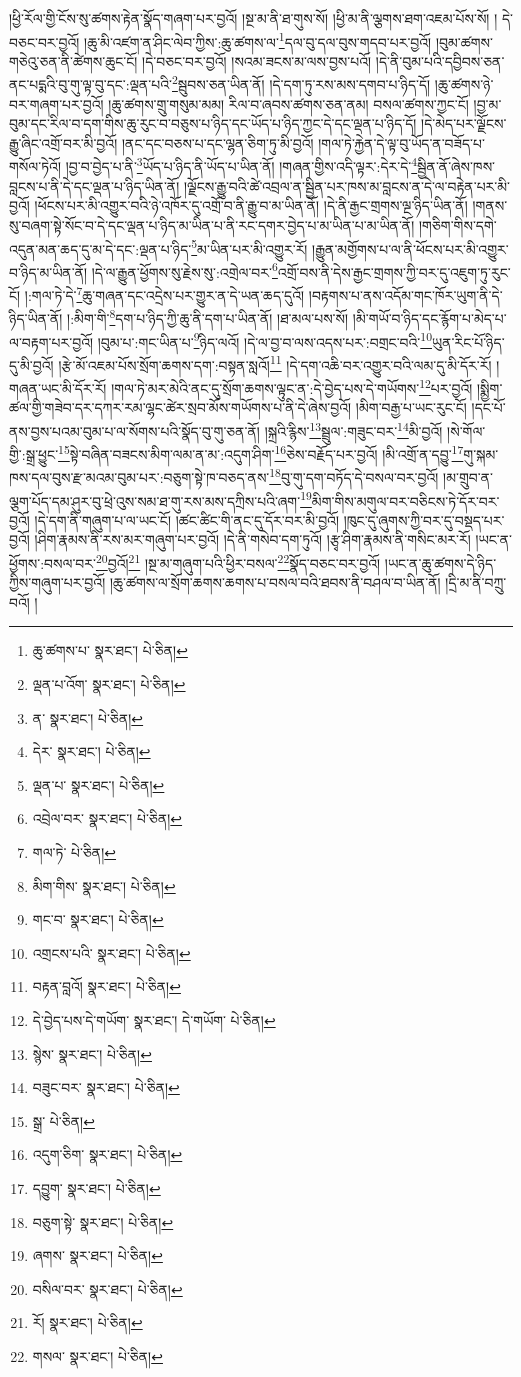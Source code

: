 །ཕྱི་རོལ་གྱི་ངོས་སུ་ཚགས་རྟེན་སྣོད་གཞག་པར་བྱའོ། །སྔ་མ་ནི་ཐ་གུས་སོ། །ཕྱི་མ་ནི་ལྕགས་ཐག་འཇམ་པོས་སོ། །
དེ་བཅང་བར་བྱའོ། །ཆུ་མི་འཛག་ན་ཤིང་ལེབ་ཀྱིས་:ཆུ་ཚགས་ལ་\footnote{ཆུ་ཚགས་པ་  སྣར་ཐང་།  པེ་ཅིན། }དལ་བུ་དལ་བུས་གདབ་པར་བྱའོ། །བུམ་ཚགས་གཅེའུ་ཅན་ནི་ཚེགས་ཆུང་ངོ། །དེ་བཅང་བར་བྱའོ། །སའམ་ཟངས་མ་ལས་བྱས་པའོ། །དེ་ནི་བུམ་པའི་དབྱིབས་ཅན་ནང་པདྨའི་བུ་གུ་ལྟ་བུ་དང་:ལྡན་པའི་\footnote{ལྡན་པ་འོག་  སྣར་ཐང་།  པེ་ཅིན། }སྦུབས་ཅན་ཡིན་ནོ། །དེ་དག་ཏུ་རས་མས་དགབ་པ་ཉིད་དོ། །ཆུ་ཚགས་ཉེ་བར་གཞག་པར་བྱའོ། །ཆུ་ཚགས་གྲུ་གསུམ་མམ། རིལ་བ་ཞབས་ཚགས་ཅན་ནམ། བསལ་ཚགས་ཀྱང་ངོ། །བྱ་མ་བུམ་དང་རིལ་བ་དག་གིས་ཆུ་རུང་བ་བཅུས་པ་ཉིད་དང་ཡོད་པ་ཉིད་ཀྱང་དེ་དང་ལྡན་པ་ཉིད་དོ། །དེ་མེད་པར་ལྗོངས་རྒྱུ་ཞིང་འགྲོ་བར་མི་བྱའོ། །ནང་དང་བཅས་པ་དང་ལྷན་ཅིག་ཏུ་མི་བྱའོ། །གལ་ཏེ་རྐྱེན་དེ་ལྟ་བུ་ཡོད་ན་བཟོད་པ་གསོལ་ཏེའོ། །བྱ་བ་བྱེད་པ་ནི་\footnote{ན་  སྣར་ཐང་།  པེ་ཅིན། }ཡོད་པ་ཉིད་ནི་ཡོད་པ་ཡིན་ནོ། །གཞན་གྱིས་འདི་ལྟར་:དེར་དེ་\footnote{དེར་  སྣར་ཐང་།  པེ་ཅིན། }སྦྱིན་ནོ་ཞེས་ཁས་བླངས་པ་ནི་དེ་དང་ལྡན་པ་ཉིད་ཡིན་ནོ། །ལྗོངས་རྒྱུ་བའི་ཚེ་འབྲལ་ན་སྦྱིན་པར་ཁས་མ་བླངས་ན་དེ་ལ་བརྟེན་པར་མི་བྱའོ། །ཕོངས་པར་མི་འགྱུར་བའི་ཉེ་འཁོར་དུ་འགྲོ་བ་ནི་རྒྱུ་བ་མ་ཡིན་ནོ། །དེ་ནི་རྒྱང་གྲགས་ལྔ་ཉིད་ཡིན་ནོ། །གནས་སུ་བཞག་སྟེ་སོང་བ་དེ་དང་ལྡན་པ་ཉིད་མ་ཡིན་པ་ནི་རང་དགར་བྱེད་པ་མ་ཡིན་པ་མ་ཡིན་ནོ། །གཅིག་གིས་དགེ་འདུན་མན་ཆད་དུ་མ་དེ་དང་:ལྡན་པ་ཉིད་\footnote{ལྡན་པ་  སྣར་ཐང་།  པེ་ཅིན། }མ་ཡིན་པར་མི་འགྱུར་རོ། །རྒྱུན་མགྱོགས་པ་ལ་ནི་ཕོངས་པར་མི་འགྱུར་བ་ཉིད་མ་ཡིན་ནོ། །དེ་ལ་རྒྱུན་ཕྱོགས་སུ་རྗེས་སུ་:འགྲེལ་བར་\footnote{འབྲེལ་བར་  སྣར་ཐང་།  པེ་ཅིན། }འགྲོ་བས་ནི་དེས་རྒྱང་གྲགས་ཀྱི་བར་དུ་འཇུག་ཏུ་རུང་ངོ། །:གལ་ཏེ་དེ་\footnote{གལ་ཏེ་  པེ་ཅིན། }ཆུ་གཞན་དང་འདྲེས་པར་གྱུར་ན་དེ་ཡན་ཆད་དུའོ། །བརྟགས་པ་ནས་འདོམ་གང་ཁོར་ཡུག་ནི་དེ་ཉིད་ཡིན་ནོ། །:མིག་གི་\footnote{མིག་གིས་  སྣར་ཐང་།  པེ་ཅིན། }དག་པ་ཉིད་ཀྱི་ཆུ་ནི་དག་པ་ཡིན་ནོ། །ཐ་མལ་པས་སོ། །མི་གཡོ་བ་ཉིད་དང་རྙོག་པ་མེད་པ་ལ་བརྟག་པར་བྱའོ། །བུམ་པ་:གང་ཡིན་པ་\footnote{གང་བ་  སྣར་ཐང་།  པེ་ཅིན། }ཉིད་ལའོ། །དེ་ལ་བྱ་བ་ལས་འདས་པར་:བགྲང་བའི་\footnote{འགྲངས་པའི་  སྣར་ཐང་།  པེ་ཅིན། }ཡུན་རིང་པོ་ཉིད་དུ་མི་བྱའོ། །རྩེ་མོ་འཇམ་པོས་སྲོག་ཆགས་དག་:བསྟན་སླའོ།\footnote{བརྟན་བླའོ།  སྣར་ཐང་།  པེ་ཅིན། } །དེ་དག་འཆི་བར་འགྱུར་བའི་ལམ་དུ་མི་དོར་རོ། །གཞན་ཡང་མི་དོར་རོ། །གལ་ཏེ་མར་མེའི་ནང་དུ་སྲོག་ཆགས་ལྟུང་ན་:དེ་བྱེད་པས་དེ་གཡོགས་\footnote{དེ་བྱེད་པས་དེ་གཡོག་  སྣར་ཐང་། དེ་གཡོག་  པེ་ཅིན། }པར་བྱའོ། །སྨྱིག་ཚལ་གྱི་གཟེབ་དར་དཀར་རམ་ལྷང་ཚེར་སྲབ་མོས་གཡོགས་པ་ནི་དེ་ཞེས་བྱའོ། །མིག་བརྒྱ་པ་ཡང་རུང་ངོ། །དང་པོ་ནས་བྱས་པའམ་བུམ་པ་ལ་སོགས་པའི་སྣོད་བུ་གུ་ཅན་ནོ། །སྐྲའི་རྙིས་\footnote{སྙེས་  སྣར་ཐང་།  པེ་ཅིན། }སྦྲུལ་:གཟུང་བར་\footnote{བཟུང་བར་  སྣར་ཐང་།  པེ་ཅིན། }མི་བྱའོ། །སེ་གོལ་གྱི་:སྒྲ་ཕྱུང་\footnote{སྒྲ་  པེ་ཅིན། }སྟེ་བཞིན་བཟངས་མིག་ལམ་ན་མ་:འདུག་ཤིག་\footnote{འདུག་ཅིག་  སྣར་ཐང་།  པེ་ཅིན། }ཅེས་བརྗོད་པར་བྱའོ། །མི་འགྲོ་ན་དབྱུ་\footnote{དབྱུག་  སྣར་ཐང་།  པེ་ཅིན། }གུ་སྐམ་ཁས་དལ་བུས་རྫ་མའམ་བུམ་པར་:བཅུག་སྟེ་ཁ་བཅད་ནས་\footnote{བཅུག་སྟེ་  སྣར་ཐང་།  པེ་ཅིན། }བུ་གུ་དག་བཏོད་དེ་བསལ་བར་བྱའོ། །མ་གྲུབ་ན་ལྕག་པོད་དམ་ཤུར་བུ་ཕྲེ་འུས་སམ་ཐ་གུ་རས་མས་དཀྲིས་པའི་ཞག་\footnote{ཞགས་  སྣར་ཐང་།  པེ་ཅིན། }མིག་གིས་མགུལ་བར་བཅིངས་ཏེ་དོར་བར་བྱའོ། །དེ་དག་ནི་གཞུག་པ་ལ་ཡང་ངོ། །ཚང་ཚིང་གི་ནང་དུ་དོར་བར་མི་བྱའོ། །ཁུང་དུ་ཞུགས་ཀྱི་བར་དུ་བསྡད་པར་བྱའོ། །ཤིག་རྣམས་ནི་རས་མར་གཞུག་པར་བྱའོ། །དེ་ནི་གསེབ་དག་ཏུའོ། །རྩྭ་ཤིག་རྣམས་ནི་གསིང་མར་རོ། །ཡང་ན་ཕྱོགས་:བསལ་བར་\footnote{བསིལ་བར་  སྣར་ཐང་།  པེ་ཅིན། }བྱའོ།\footnote{རོ།  སྣར་ཐང་།  པེ་ཅིན། } །སྔ་མ་གཞུག་པའི་ཕྱིར་བསལ་\footnote{གསལ་  སྣར་ཐང་།  པེ་ཅིན། }སྣོད་བཅང་བར་བྱའོ། །ཡང་ན་ཆུ་ཚགས་དེ་ཉིད་ཀྱིས་གཞུག་པར་བྱའོ། །ཆུ་ཚགས་ལ་སྲོག་ཆགས་ཆགས་པ་བསལ་བའི་ཐབས་ནི་བཤལ་བ་ཡིན་ནོ། །དྲི་མ་ནི་བཀྲུ་བའོ། །
